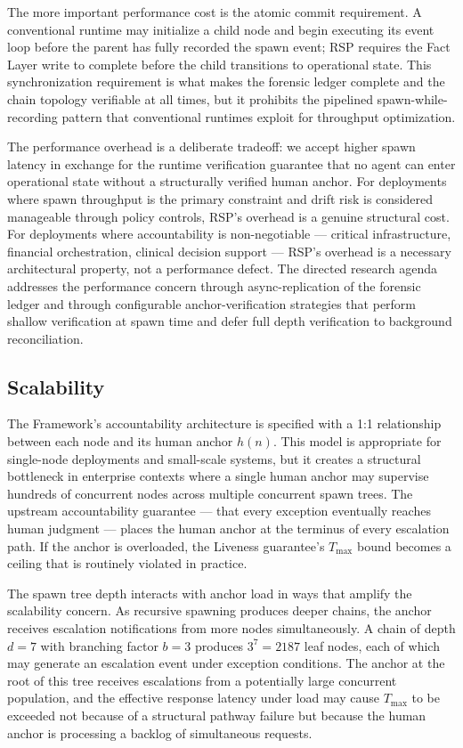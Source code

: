 The more important performance cost is the atomic commit requirement. A conventional runtime may initialize a child node and begin executing its event loop before the parent has fully recorded the spawn event; RSP requires the Fact Layer write to complete before the child transitions to operational state. This synchronization requirement is what makes the forensic ledger complete and the chain topology verifiable at all times, but it prohibits the pipelined spawn-while-recording pattern that conventional runtimes exploit for throughput optimization.

The performance overhead is a deliberate tradeoff: we accept higher spawn latency in exchange for the runtime verification guarantee that no agent can enter operational state without a structurally verified human anchor. For deployments where spawn throughput is the primary constraint and drift risk is considered manageable through policy controls, RSP's overhead is a genuine structural cost. For deployments where accountability is non-negotiable — critical infrastructure, financial orchestration, clinical decision support — RSP's overhead is a necessary architectural property, not a performance defect. The directed research agenda addresses the performance concern through async-replication of the forensic ledger and through configurable anchor-verification strategies that perform shallow verification at spawn time and defer full depth verification to background reconciliation.

\subsection{Scalability}\label{sec:rs-limitations:scalability}

The \bxthree{} Framework's accountability architecture is specified with a 1:1 relationship between each node and its human anchor $h(n)$. This model is appropriate for single-node deployments and small-scale systems, but it creates a structural bottleneck in enterprise contexts where a single human anchor may supervise hundreds of concurrent nodes across multiple concurrent spawn trees. The upstream accountability guarantee — that every exception eventually reaches human judgment — places the human anchor at the terminus of every escalation path. If the anchor is overloaded, the Liveness guarantee's $T_{\max}$ bound becomes a ceiling that is routinely violated in practice.

The spawn tree depth interacts with anchor load in ways that amplify the scalability concern. As recursive spawning produces deeper chains, the anchor receives escalation notifications from more nodes simultaneously. A chain of depth $d = 7$ with branching factor $b = 3$ produces $3^7 = 2187$ leaf nodes, each of which may generate an escalation event under exception conditions. The anchor at the root of this tree receives escalations from a potentially large concurrent population, and the effective response latency under load may cause $T_{\max}$ to be exceeded not because of a structural pathway failure but because the human anchor is processing a backlog of simultaneous requests.

